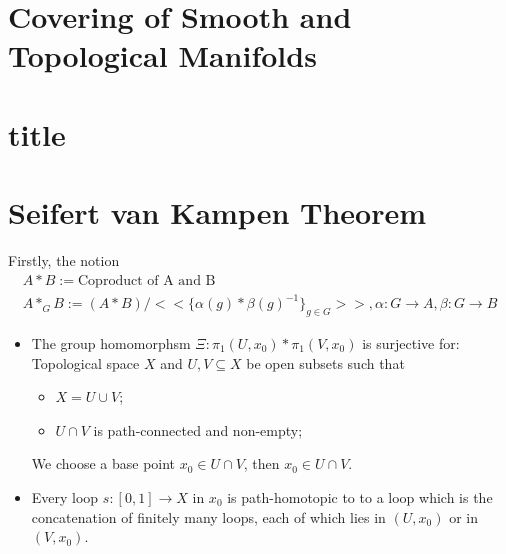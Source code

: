 \documentclass[Total.tex]{subfiles}
\begin{document}
		\section{Covering of Smooth and Topological Manifolds}
		\section{title}
		\section{Seifert van Kampen Theorem}
		Firstly, the notion
		\begin{gather*}
			A*B:=\mbox{Coproduct of A and B}\\
			A*_G B:=(A*B)/<<\{\alpha(g)*\beta(g)^{-1}\}_{g\in G}>>,\alpha:G\rightarrow A,\beta:G\rightarrow B
		\end{gather*}
		\begin{center}
		\end{center}
		\begin{lemma}
			\begin{itemize}
				\item The group homomorphsm $\Xi:\pi_1(U,x_0)*\pi_1(V,x_0)$ is surjective for: Topological space $X$ and $U,V\subseteq X$ be open subsets such that
				\begin{itemize}
					\item $X=U\cup V$;
					\item $U\cap V$ is path-connected and non-empty;
				\end{itemize}
				We choose a base point $x_0\in U\cap V$, then $x_0\in U\cap V$. 
				\item Every loop $s:[0,1]\rightarrow X$ in $x_0$ is path-homotopic to to a loop which is the concatenation of finitely many loops, each of which lies in $(U,x_0)$ or in $(V,x_0)$.
			\end{itemize}
		\end{lemma}
\end{document}
